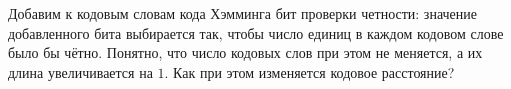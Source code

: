 Добавим к кодовым словам кода Хэмминга бит проверки четности: значение добавленного бита выбирается так, чтобы число единиц в
каждом кодовом слове было бы чётно. Понятно, что число кодовых слов при этом не меняется, а их длина увеличивается на
$1$. Как при этом изменяется кодовое расстояние?